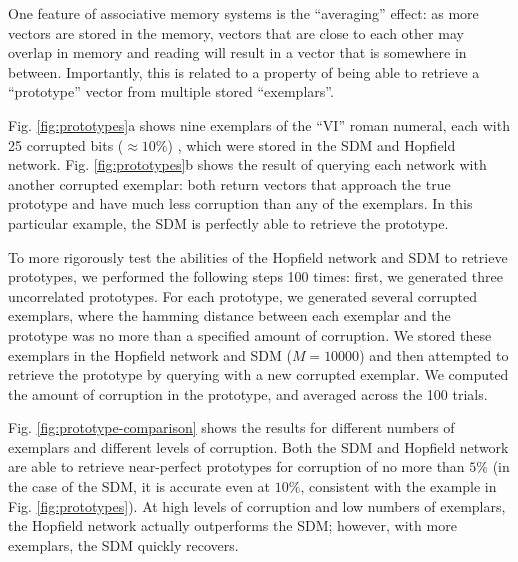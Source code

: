 \documentclass[10pt,letterpaper]{article}
\begin{document}
One feature of associative memory systems is the ``averaging'' effect:
as more vectors are stored in the memory, vectors that are close to
each other may overlap in memory and reading will result in a vector
that is somewhere in between. Importantly, this is related to a
property of being able to retrieve a ``prototype'' vector from
multiple stored ``exemplars''.

Fig. \ref{fig:prototypes}a shows nine exemplars of the ``VI'' roman
numeral, each with 25 corrupted bits ($\approx10\%$) , which were
stored in the SDM and Hopfield network. Fig. \ref{fig:prototypes}b
shows the result of querying each network with another corrupted
exemplar: both return vectors that approach the true prototype and
have much less corruption than any of the exemplars. In this
particular example, the SDM is perfectly able to retrieve the
prototype.

To more rigorously test the abilities of the Hopfield network and SDM
to retrieve prototypes, we performed the following steps 100 times:
first, we generated three uncorrelated prototypes. For each prototype,
we generated several corrupted exemplars, where the hamming distance
between each exemplar and the prototype was no more than a specified
amount of corruption. We stored these exemplars in the Hopfield
network and SDM ($M=10000$) and then attempted to retrieve the
prototype by querying with a new corrupted exemplar. We computed the
amount of corruption in the prototype, and averaged across the 100
trials. 

Fig. \ref{fig:prototype-comparison} shows the results for different
numbers of exemplars and different levels of corruption. Both the SDM
and Hopfield network are able to retrieve near-perfect prototypes for
corruption of no more than $5\%$ (in the case of the SDM, it is
accurate even at $10\%$, consistent with the example in
Fig. \ref{fig:prototypes}). At high levels of corruption and low
numbers of exemplars, the Hopfield network actually outperforms the
SDM; however, with more exemplars, the SDM quickly recovers.
\end{document}
